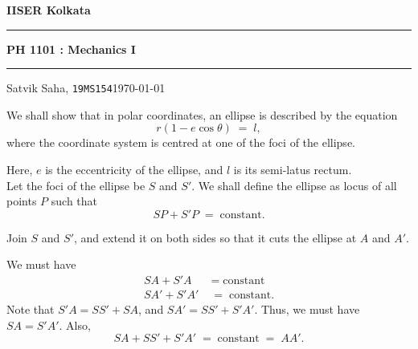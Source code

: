 \documentclass[10pt]{article}
\begin{document}
        \par\textbf{IISER Kolkata} \hfill
        \vspace{3pt}
        \hrule
        \vspace{3pt}
        \begin{center}
                \LARGE{\textbf{PH 1101 : Mechanics I}}
        \end{center}
        \vspace{3pt}
        \hrule
        \vspace{3pt}
        Satvik Saha, \texttt{19MS154}\hfill\today
        \vspace{20pt}

        We shall show that in polar coordinates, an ellipse is described by the equation
        \[
                r (1 - e \cos\theta) \;=\; l,
        \]
        where the coordinate system is centred at one of the foci of the ellipse.

        Here, $e$ is the eccentricity of the ellipse, and $l$ is its semi-latus rectum.\\

        Let the foci of the ellipse be $S$ and $S'$. We shall define the ellipse as locus of all points $P$ such that
        \[
                SP + S'P \;=\; \text{constant}.
        \]

        Join $S$ and $S'$, and extend it on both sides so that it cuts the ellipse at $A$ and $A'$.

        \begin{center}
        \end{center}

        We must have
        \begin{align*}
                SA + S'A \;&=\; \text{constant}\\
                SA' + S'A' \;&=\; \text{constant}.
        \end{align*}
        Note that $S'A = SS' + SA$, and $SA' = SS' + S'A'$. Thus, we must have $SA = S'A'$. Also,
        \[
                SA + SS' + S'A' \;=\; \text{constant} \;=\; AA'.
        \]
\end{document}

